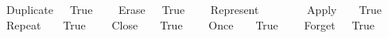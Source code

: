 \ \ {\isacharbar}\ {\isachardoublequoteopen}\ {\isacharparenleft}Duplicate\ \ {\isacharequal}\ True{\isachardoublequoteclose}\isanewline
\ \ {\isacharbar}\ {\isachardoublequoteopen}\ {\isacharparenleft}Erase\ \ {\isacharequal}\ True{\isachardoublequoteclose}\isanewline
\ \ {\isacharbar}\ {\isachardoublequoteopen}\ {\isacharparenleft}Represent\ \ {\isacharequal}\ \ \isanewline
\ \ {\isacharbar}\ {\isachardoublequoteopen}\ {\isacharparenleft}Apply\ \ \ {\isacharequal}\ True{\isachardoublequoteclose}\isanewline
\ \ {\isacharbar}\ {\isachardoublequoteopen}\ {\isacharparenleft}Repeat\ \ \ {\isacharequal}\ True{\isachardoublequoteclose}\isanewline
\ \ {\isacharbar}\ {\isachardoublequoteopen}\ {\isacharparenleft}Close\ \ \ {\isacharequal}\ True{\isachardoublequoteclose}\isanewline
\ \ {\isacharbar}\ {\isachardoublequoteopen}\ {\isacharparenleft}Once\ \ \ {\isacharequal}\ True{\isachardoublequoteclose}\isanewline
\ \ {\isacharbar}\ {\isachardoublequoteopen}\ {\isacharparenleft}Forget\ \ {\isacharequal}\ True{\isachardoublequoteclose}

